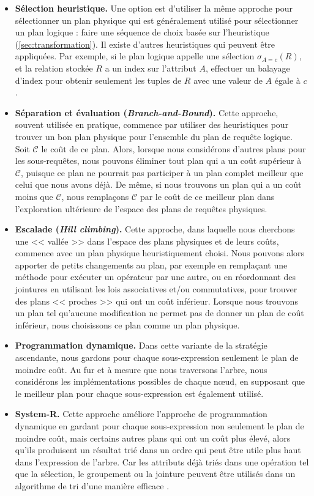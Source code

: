 \begin{itemize}
 \item \textbf{Sélection heuristique.} Une option est d'utiliser la même approche pour sélectionner un plan physique qui est généralement utilisé pour sélectionner un plan logique : faire une séquence de choix basée sur l'heuristique (\ref{sec:transformation}). Il existe d'autres heuristiques qui peuvent être appliquées. Par exemple, si le plan logique appelle une sélection $\sigma_{A=c}(R)$, et la relation stockée $R$ a un index sur l'attribut $A$, effectuer un balayage d'index pour obtenir seulement les tuples de $R$ avec une valeur de $A$ égale à $c$.
 \item \textbf{Séparation et évaluation (\textit{Branch-and-Bound}).} Cette approche, souvent utilisée en pratique, commence par utiliser des heuristiques pour trouver un bon plan physique pour l'ensemble du plan de requête logique. Soit $\mathcal{C}$ le coût de ce plan. Alors, lorsque nous considérons d'autres plans pour les sous-requêtes, nous pouvons éliminer tout plan qui a un coût supérieur à $\mathcal{C}$, puisque ce plan ne pourrait pas participer à un plan complet meilleur que celui que nous avons déjà. De même, si nous trouvons un plan qui a un coût moins que $\mathcal{C}$, nous remplaçons $\mathcal{C}$ par le coût de ce meilleur plan dans l'exploration ultérieure de l'espace des plans de requêtes physiques.
 \item \textbf{Escalade (\textit{Hill climbing}).} Cette approche, dans laquelle nous cherchons une << vallée >> dans l'espace des plans physiques et de leurs coûts, commence avec un plan physique heuristiquement choisi. Nous pouvons alors apporter de petits changements au plan, par exemple en remplaçant une méthode pour exécuter un opérateur par une autre, ou en réordonnant des jointures en utilisant les lois associatives et/ou commutatives, pour trouver des plans << proches >> qui ont un coût inférieur. Lorsque nous trouvons un plan tel qu'aucune modification ne permet pas de donner un plan de coût inférieur, nous choisissons ce plan comme un plan physique.
 \item \textbf{Programmation dynamique.} Dans cette variante de la stratégie ascendante, nous gardons pour chaque sous-expression seulement le plan de moindre coût. Au fur et à mesure que nous traversons l'arbre, nous considérons les implémentations possibles de chaque nœud, en supposant que le meilleur plan pour chaque sous-expression est également utilisé.
 \item \textbf{System-R.} Cette approche améliore l'approche de programmation dynamique en gardant pour chaque sous-expression non seulement le plan de moindre coût, mais certains autres plans qui ont un coût plus élevé, alors qu'ils produisent un résultat trié dans un ordre qui peut être utile plus haut dans l'expression de l'arbre. Car les attributs déjà triés dans une opération tel que la sélection, le groupement ou la jointure peuvent être utilisés dans un algorithme de tri d'une manière efficace \cite{Selinger79}.
\end{itemize}

